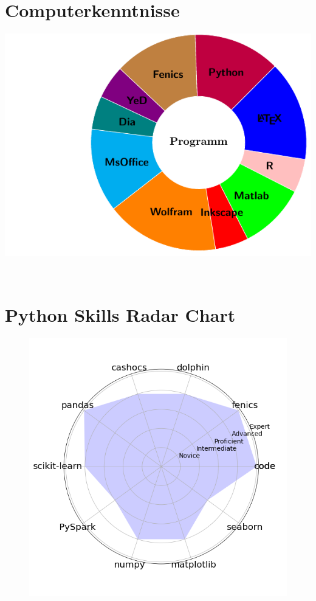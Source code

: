 \documentclass[a4paper]{cv-class}
\let\oldincludegraphics\includegraphics
\renewcommand\includegraphics[2][]{%
  \oldincludegraphics[#1,max width=10cm,max height=\textheight]{#2}
}
\begin{document}
\begin{aside}
\section{Computerkenntnisse}
  
  \hspace{-.8cm}
    \includegraphics[width=\textwidth,height=\textheight,keepaspectratio]{img/software.pdf} 
    ~
\section{Python Skills Radar Chart}
\begin{figure}[h]
\flushleft 
\includegraphics[width=1.0\textwidth]{img/skills_radar_chart.png}
\end{figure}

\end{aside}
\end{document}
